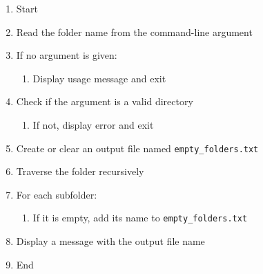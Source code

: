 \begin{enumerate}
    \item Start
    \item Read the folder name from the command-line argument
    \item If no argument is given:
    \begin{enumerate}
        \item Display usage message and exit
    \end{enumerate}
    \item Check if the argument is a valid directory
    \begin{enumerate}
        \item If not, display error and exit
    \end{enumerate}
    \item Create or clear an output file named \texttt{empty\_folders.txt}
    \item Traverse the folder recursively
    \item For each subfolder:
    \begin{enumerate}
        \item If it is empty, add its name to \texttt{empty\_folders.txt}
    \end{enumerate}
    \item Display a message with the output file name
    \item End
\end{enumerate}

